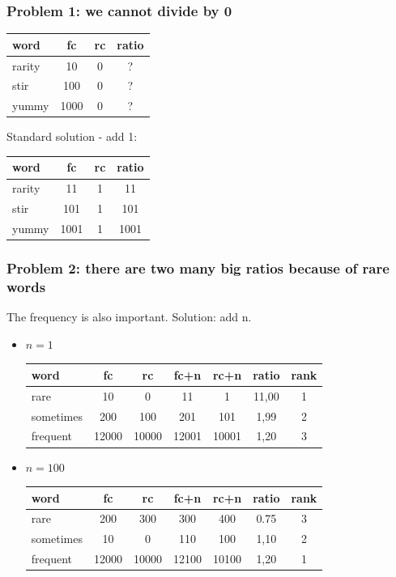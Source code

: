 \documentclass[svgnames]{beamer}
\begin{document}
\begin{frame}
  \frametitle{Problem 1:  we cannot divide by 0}
  \begin{tabular}[l]{lccc}
    word & fc & rc & ratio \\
    \hline
    rarity & 10 & 0 &  ? \\
    stir & 100 & 0 &  ? \\
    yummy & 1000 & 0 &  ? \\
  \end{tabular}
\end{frame}

\begin{frame}

Standard solution - add 1:
  \begin{tabular}[l]{lccc}
    word & fc & rc & ratio \\
    \hline
    rarity & 11 & 1 &  11 \\
    stir & 101 & 1 &  101 \\
    yummy & 1001 & 1 &  1001 \\
  \end{tabular}
\end{frame}

\begin{frame}
  \frametitle{Problem 2: there are two many big ratios because of rare words}
  The frequency is also important.   Solution: add n.

  \begin{itemize}
  \item $n=1$

  \begin{tabular}[l]{lcccccc}
    word & fc & rc & fc+n & rc+n & ratio & rank \\
    \hline
    rare & 10 & 0 & 11 & 1 & 11,00 & 1 \\
    sometimes & 200 & 100 & 201 & 101 & 1,99 & 2 \\
    frequent & 12000 & 10000 & 12001 & 10001 & 1,20 & 3 \\
  \end{tabular}
  
  \item $n=100$

  \begin{tabular}[l]{lcccccc}
    word & fc & rc & fc+n & rc+n & ratio & rank \\
    \hline
    rare & 200 & 300 & 300 & 400 & 0.75 & 3 \\
    sometimes & 10 & 0 & 110 & 100 & 1,10 &  2 \\
    frequent & 12000 & 10000 & 12100 & 10100 & 1,20 & 1 \\
  \end{tabular}

  \end{itemize}
  
\end{frame}
\end{document}
